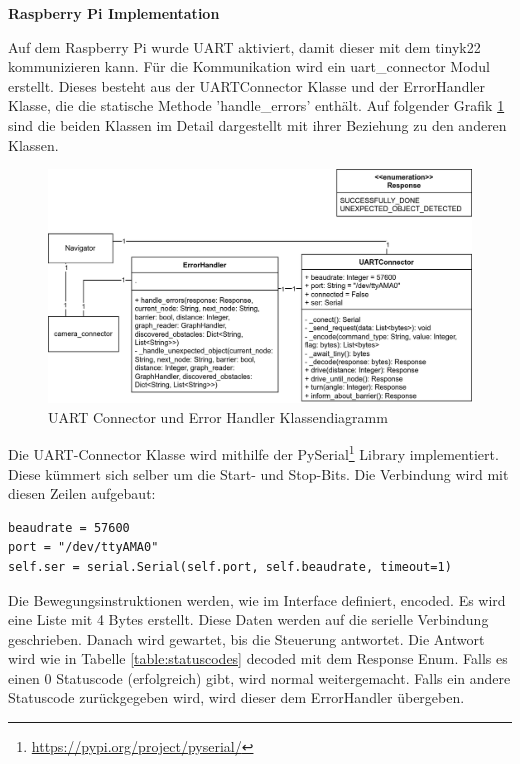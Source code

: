 \textbf{Raspberry Pi Implementation}

Auf dem Raspberry Pi wurde UART aktiviert, damit dieser mit dem \gls{tinyk22} kommunizieren kann.
Für die Kommunikation wird ein uart\_connector Modul erstellt. Dieses besteht aus der UARTConnector Klasse und der ErrorHandler Klasse, die die statische Methode 'handle\_errors' enthält. Auf folgender Grafik \ref{fig:uart-connector-nav} sind die beiden Klassen im Detail dargestellt mit ihrer Beziehung zu den anderen Klassen.

\begin{figure}[H]
\centering
\includegraphics[width=\textwidth]{assets/IT/robot-sw-architecture-uart-connector.png}
\caption{UART Connector und Error Handler Klassendiagramm}
\label{fig:uart-connector-nav}
\end{figure}

Die UART-Connector Klasse  wird mithilfe der PySerial\footnote{\url{https://pypi.org/project/pyserial/}} Library implementiert. Diese kümmert sich selber um die Start- und Stop-Bits.
Die Verbindung wird mit diesen Zeilen aufgebaut:

\begin{verbatim}
beaudrate = 57600
port = "/dev/ttyAMA0"
self.ser = serial.Serial(self.port, self.beaudrate, timeout=1)
\end{verbatim}

Die Bewegungsinstruktionen werden, wie im Interface definiert, encoded. Es wird eine Liste mit 4 Bytes erstellt.
Diese Daten werden auf die serielle Verbindung geschrieben.
Danach wird gewartet, bis die Steuerung antwortet. Die Antwort wird wie in Tabelle \ref{table:statuscodes} decoded mit dem Response Enum.
Falls es einen 0 Statuscode (erfolgreich) gibt, wird normal weitergemacht. Falls ein andere Statuscode zurückgegeben wird, wird dieser dem ErrorHandler übergeben.

